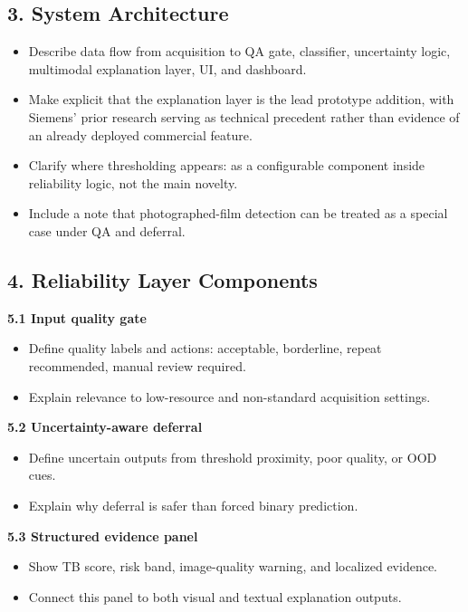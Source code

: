\documentclass[11pt]{article}
\begin{document}
\subsection{3. System Architecture}

\begin{itemize}[leftmargin=1.5em]
    \item Describe data flow from acquisition to QA gate, classifier, uncertainty logic, multimodal explanation layer, UI, and dashboard.
    \item Make explicit that the explanation layer is the lead prototype addition, with Siemens' prior research serving as technical precedent rather than evidence of an already deployed commercial feature.
    \item Clarify where thresholding appears: as a configurable component inside reliability logic, not the main novelty.
    \item Include a note that photographed-film detection can be treated as a special case under QA and deferral.
\end{itemize}

\subsection{4. Reliability Layer Components}

\textbf{5.1 Input quality gate}
\begin{itemize}[leftmargin=1.5em]
    \item Define quality labels and actions: acceptable, borderline, repeat recommended, manual review required.
    \item Explain relevance to low-resource and non-standard acquisition settings.
\end{itemize}

\textbf{5.2 Uncertainty-aware deferral}
\begin{itemize}[leftmargin=1.5em]
    \item Define uncertain outputs from threshold proximity, poor quality, or OOD cues.
    \item Explain why deferral is safer than forced binary prediction.
\end{itemize}

\textbf{5.3 Structured evidence panel}
\begin{itemize}[leftmargin=1.5em]
    \item Show TB score, risk band, image-quality warning, and localized evidence.
    \item Connect this panel to both visual and textual explanation outputs.
\end{itemize}
\end{document}
